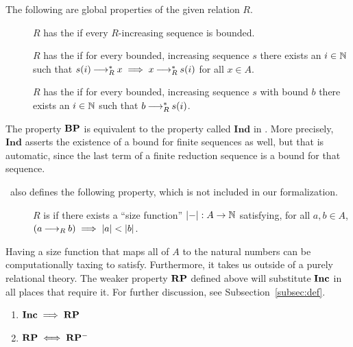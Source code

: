 \begin{definition} \label{def:rp}
  The following are global properties of the given relation $R$.  \hfill
    \begin{description}
        \item[\bq {}] $R$ has the  if every $R$-increasing sequence is bounded.
        \item[\bq {}] $R$ has the  if for every bounded, increasing sequence $s$ there exists an $i \in \mathbb{N}$ such that
        $s (i) \mathbin{\longrightarrow_R^*} x \implies x \mathbin{\longrightarrow_R^*} s (i)$ for all $x\in A$.
        \item[\bq {}] $R$ has the  if for every bounded, increasing sequence $s$ with bound $b$ there exists an $i \in \mathbb{N}$ such that $b \mathbin{\longrightarrow_R^*} s (i)$.
    \end{description}
\end{definition}

The property $\mathbf{BP}$ is equivalent to the property called $\mathbf{Ind}$ in \terese. More precisely, $\mathbf{Ind}$ asserts the existence of a bound for finite sequences as well, but that is automatic, since the last term of a finite reduction sequence is a bound for that sequence.

\terese $\,$ also defines the following property, which is not included in our formalization.

\begin{definition} \hfill
    \begin{description}
        \item[\bq  {}] $R$ is  if there exists a ``size function'' $|{-}| : A \to \mathbb{N}$ satisfying, for all $a, b \in A$,
        $(a \mathbin{\longrightarrow_R} b) \implies |a| < |b|$.
    \end{description}
\end{definition}

Having a size function that maps all of $A$ to the natural numbers can be computationally taxing to satisfy.
Furthermore, it takes us outside of a purely relational theory. The weaker property $\mathbf{RP}$ defined above will substitute $\mathbf{Inc}$ in all places that require it. For further discussion, see Subsection~\ref{subsec:def}.

\begin{proposition}\hfill
    \begin{enumerate}
        \item $\mathbf{Inc} \implies \mathbf{RP}$
        \item $\mathbf{RP} \iff \mathbf{RP^{-}}$
    \end{enumerate}
\end{proposition}

